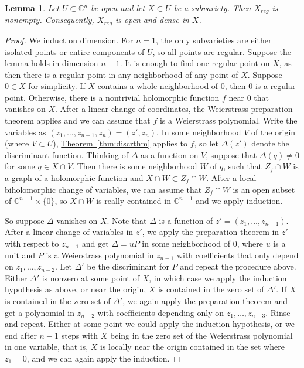 \documentclass[12pt,openany]{book}
\newcommand{\C}{{\mathbb{C}}}
\theoremstyle{plain}
\newtheorem{lemma}[thm]{Lemma}
\theoremstyle{remark}
\theoremstyle{definition}
\theoremstyle{exercise}
\theoremstyle{example}
\newcommand{\thmref}[1]{\hyperref[#1]{Theorem~\ref*{#1}}}
\begin{document}
\begin{lemma} \label{lemma:regdense}
Let $U \subset \C^n$ be open and let $X \subset U$ be a subvariety.
Then $X_{\mathit{reg}}$ is nonempty.  Consequently, $X_{\mathit{reg}}$ is
open and dense in $X$.
\end{lemma}

\begin{proof}
We induct on dimension.  For $n=1$,
the only subvarieties are either isolated points or entire components of
$U$, so all points are regular.
Suppose the lemma holds in dimension $n-1$.
It is enough to find one regular point on $X$, as 
then there is a regular point in
any neighborhood of any point of $X$.
Suppose $0 \in X$ for simplicity.
If $X$ contains a whole neighborhood of $0$, then
$0$ is a regular point. 
Otherwise, there is a nontrivial holomorphic function
$f$ near $0$ that vanishes on $X$.
After a linear change of coordinates, the
Weierstrass preparation theorem applies and we can assume that $f$ is a
Weierstrass polynomial.  Write the variables as
$(z_1,\ldots,z_{n-1},z_n) = (z',z_n)$.
In some neighborhood $V$ of the origin (where $V \subset U$),
\thmref{thm:discrthm} applies to $f$, so
let $\Delta(z')$ denote the discriminant function.
Thinking of $\Delta$ as a function
on $V$, suppose that $\Delta(q) \neq 0$ for some $q \in X \cap V$.
Then there is some
neighborhood $W$ of $q$, such that $Z_f \cap W$ is a
graph of a holomorphic function and $X \cap W \subset Z_f \cap W$.
After a local biholomorphic change of variables, we can assume that
$Z_f \cap W$ is an open subset of $\C^{n-1} \times \{ 0 \}$,
so $X \cap W$ is really contained in
$\C^{n-1}$ and we apply induction.

So suppose $\Delta$ vanishes on $X$.  Note that
$\Delta$ is a function of $z'=(z_1,\ldots,z_{n-1})$.
After a linear change of variables in $z'$,
we apply the preparation theorem in $z'$ with respect to $z_{n-1}$
and get $\Delta = u P$ in some neighborhood of $0$,
where $u$ is a unit and $P$ is a Weierstrass polynomial
in $z_{n-1}$ with coefficients that only depend on
$z_1,\ldots,z_{n-2}$.
Let $\Delta'$ be the discriminant for $P$ and repeat the procedure
above.  Either $\Delta'$ is nonzero at some point of $X$,
in which case we apply the induction hypothesis as above,
or near the
origin, $X$ is contained in the zero set of $\Delta'$.  If $X$ is contained
in the zero set of $\Delta'$, we again apply the preparation theorem
and get a polynomial in $z_{n-2}$ with coefficients depending only on
$z_1,\ldots,z_{n-3}$.  Rinse and repeat.  Either at some point we could
apply the induction hypothesis, or we end after $n-1$ steps with $X$ being
in the zero set of the Weierstrass polynomial in one variable, that is,
$X$ is locally near the origin contained in the
set where $z_1 = 0$, and we can again apply the induction.
\end{proof}
\end{document}
